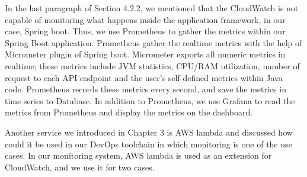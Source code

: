 \par
In the last paragraph of Section 4.2.2, we mentioned that the CloudWatch is not capable of monitoring what happens inside the application framework, in our case, Spring boot. Thus, we use Prometheus to gather the metrics within our Spring Boot application. Prometheus gather the realtime metrics with the help of Micrometer plugin of Spring boot. Micrometer exports all numeric metrics in realtime; these metrics include JVM statistics, CPU/RAM utilization, number of request to each API endpoint and the user's self-defined metrics within Java code. Prometheus records these metrics every second, and save the metrics in time series to Database. In addition to Prometheus, we use Grafana to read the metrics from Prometheus and display the metrics on the dashboard.
\par
Another service we introduced in Chapter 3 is AWS lambda and discussed how could it be used in our DevOps toolchain in which monitoring is one of the use cases. In our monitoring system, AWS lambda is used as an extension for CloudWatch, and we use it for two cases.

